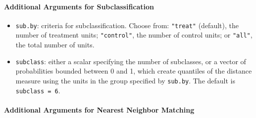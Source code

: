 \paragraph{Additional Arguments for Subclassification}
\label{subsubsec:inputs-subclass}

\begin{itemize}
\item \texttt{sub.by}: criteria for subclassification.  Choose from: \texttt{"treat"}
(default), the number of treatment units; \texttt{"control"}, the
  number of control units; or \texttt{"all"}, the total
  number of units.
\item \texttt{subclass}: either a scalar specifying the number
  of subclasses, or a vector of probabilities bounded between 0
  and 1, which create quantiles of the distance measure using the units
  in the group specified by \texttt{sub.by}.  The default is
  \texttt{subclass = 6}.
\end{itemize}

\paragraph{Additional Arguments for Nearest Neighbor Matching}
\label{subsubsec:inputs-nearest}

